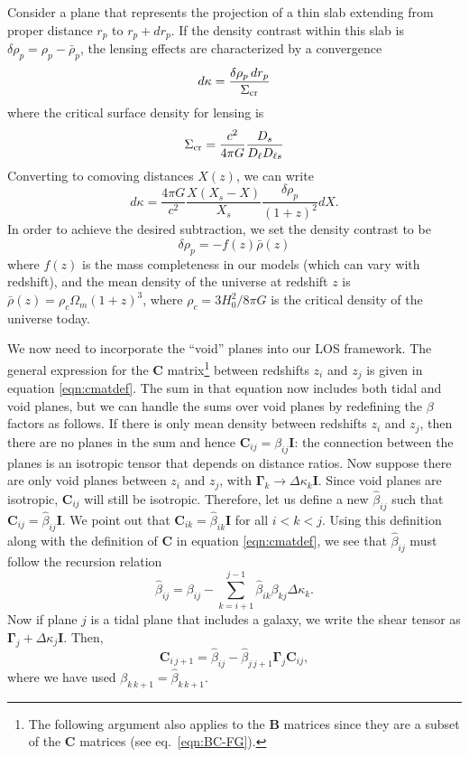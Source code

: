 \documentclass{emulateapj}
\newcommand\B[0]{\mathbf{B}}
\newcommand\C[0]{\mathbf{C}}
\newcommand\I[0]{\mathbf{I}}
\newcommand\GammaMat[0]{\boldsymbol{\Gamma}}
\newcommand\drho{\delta\rho}
\newcommand\Sigcrit{\Sigma_{\rm{cr}}}
\newcommand\betahat{\hat{\beta}}
\begin{document}
Consider a plane that represents the projection of a thin slab extending from proper distance $r_p$ to $r_p+dr_p$.  If the density contrast within this slab is $\drho_p = \rho_p - \bar\rho_p$, the lensing effects are characterized by a convergence
\begin{equation}
  d\kappa = \frac{\drho_p\,dr_p}{\Sigcrit}
\end{equation}
where the critical surface density for lensing is
\begin{equation}
  \Sigcrit = \frac{c^2}{4 \pi G} \frac{D_s}{D_\ell D_{\ell s}}
\end{equation}
Converting to comoving distances $X(z)$, we can write
\begin{equation}\label{eqn:dkappa}
  d\kappa = \frac{4 \pi G}{c^2}\frac{X (X_s - X)}{X_s} \frac{\drho_p}{(1+z)^2} dX.
\end{equation}
In order to achieve the desired subtraction, we set the density contrast to be
\begin{equation}
  \drho_p = -f(z) \bar{\rho}(z) 
\end{equation}
where $f(z)$ is the mass completeness in our models (which can vary with redshift), and the mean density of the universe at redshift $z$ is $\bar{\rho}(z) = \rho_{c} \Omega_m (1 + z)^3$, where $\rho_{c} = 3 H_0^2 / 8 \pi G$ is the critical density of the universe today.

We now need to incorporate the ``void'' planes into our LOS framework.  The general expression for the $\C$ matrix\footnote{The following argument also applies to the $\B$ matrices since they are a subset of the $\C$ matrices (see eq.\ \ref{eqn:BC-FG}).} between redshifts $z_i$ and $z_j$ is given in equation \ref{eqn:cmatdef}. The sum in that equation now includes both tidal and void planes, but we can handle the sums over void planes by redefining the $\beta$ factors as follows.  If there is only mean density between redshifts $z_i$ and $z_j$, then there are no planes in the sum and hence $\C_{i j} = \beta_{i j } \I$: the connection between the planes is an isotropic tensor that depends on distance ratios. Now suppose there are only void planes between $z_i$ and $z_j$, with $\GammaMat_k \rightarrow \Delta \kappa_k \I$. Since void planes are isotropic, $\C_{i j}$ will still be isotropic. Therefore, let us define a new $\betahat_{i j}$ such that $\C_{i j} = \betahat_{i j} \I$. We point out that $\C_{i k } = \betahat_{i k} \I$ for all $i < k < j$. Using this definition along with the definition of $\C$ in equation \ref{eqn:cmatdef}, we see that $\betahat_{i j}$ must follow the recursion relation
\begin{equation}
\label{eqn:betahatdef}
\betahat_{i j}  = \beta_{i j} - \sum \limits_{k = i +1}^{j -1} \betahat_{i k} \beta_{k j} \Delta \kappa_k.
\end{equation}
Now if plane $j$ is a tidal plane that includes a galaxy, we write the shear tensor as $\GammaMat_j + \Delta \kappa_j \I$. Then,
\begin{equation}
\C_{i \, j +1} = \betahat_{i j}  - \betahat_{j \, j+1} \GammaMat_j \C_{i j},
\end{equation}
where we have used $\beta_{k \, k+1} = \betahat_{k\, k+1}$.
\end{document}
